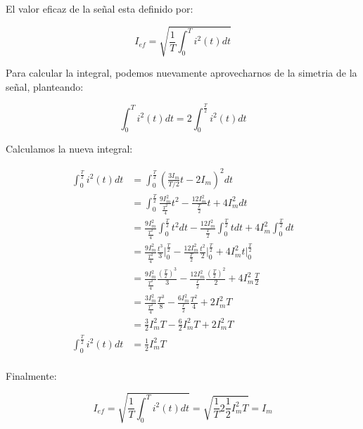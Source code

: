 El valor eficaz de la señal esta definido por:

\begin{equation}
  I_{ef}= \sqrt{ \frac{1}{T} \int_0^T i^2(t) dt }
\end{equation}

Para calcular la integral, podemos nuevamente aprovecharnos de la simetria de la señal, planteando:

\begin{equation}
  \int_0^T i^2(t) dt = 2 \int_0^{\frac{T}{2}} i^2(t) dt
\end{equation}

Calculamos la nueva integral:

\begin{align*}
  \int_0^{\frac{T}{2}} i^2(t) dt &= \int_0^{\frac{T}{2}} \left(\frac{3I_m}{T/2} t - 2I_m\right)^2 dt\\
  &= \int_0^{\frac{T}{2}} \frac{9I_m^2}{\frac{T^2}{4}} t^2 - \frac{12 I_m^2}{\frac{T}{2}} t + 4I_m^2 dt\\
  &= \frac{9I_m^2}{\frac{T^2}{4}} \int_0^{\frac{T}{2}} t^2 dt - \frac{12 I_m^2}{\frac{T}{2}} \int_0^{\frac{T}{2}} t dt + 4I_m^2 \int_0^{\frac{T}{2}} dt\\
  &= \frac{9I_m^2}{\frac{T^2}{4}} \frac{t^3}{3} \bigg|_0^{\frac{T}{2}} - \frac{12 I_m^2}{\frac{T}{2}} \frac{t^2}{2} \bigg|_0^{\frac{T}{2}} + 4I_m^2 t \Big|_0^{\frac{T}{2}} \\
  &= \frac{9I_m^2}{\frac{T^2}{4}} \frac{\left(\frac{T}{2}\right)^3}{3} - \frac{12 I_m^2}{\frac{T}{2}} \frac{\left(\frac{T}{2}\right)^2}{2} + 4I_m^2 \frac{T}{2} \\
  &= \frac{3I_m^2}{\frac{T^2}{4}} \frac{T^3}{8} - \frac{6 I_m^2}{\frac{T}{2}} \frac{T^2}{4} + 2I_m^2 T \\
  &= \frac{3}{2} I_m^2T - \frac{6}{2} I_m^2 T + 2I_m^2 T \\
  \int_0^{\frac{T}{2}} i^2(t) dt &= \frac{1}{2} I_m^2 T\\
\end{align*}

Finalmente:

\begin{equation}
  I_{ef}= \sqrt{ \frac{1}{T} \int_0^T i^2(t) dt } = \sqrt{ \frac{1}{T} 2 \frac{1}{2} I_m^2 T} = I_m
\end{equation}

